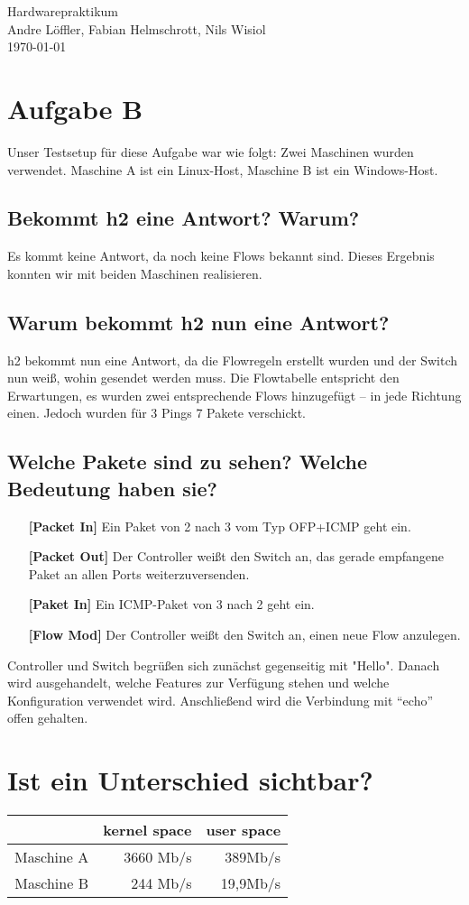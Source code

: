 \documentclass[a4paper,10pt]{scrartcl}
\begin{document}
\begin{center}
  \Huge Hardwarepraktikum \\
  \large Andre Löffler, Fabian Helmschrott, Nils Wisiol \\
  \today
\end{center}


\section*{Aufgabe B}
  Unser Testsetup für diese Aufgabe war wie folgt: Zwei Maschinen wurden verwendet. Maschine A ist ein Linux-Host, Maschine B ist ein Windows-Host.
\subsection*{Bekommt h2 eine Antwort? Warum?}
  Es kommt keine Antwort, da noch keine Flows bekannt sind. Dieses Ergebnis konnten wir mit beiden Maschinen realisieren.
\subsection*{Warum bekommt h2 nun eine Antwort?}
  h2 bekommt nun eine Antwort, da die Flowregeln erstellt wurden und der Switch nun weiß, wohin gesendet werden muss. Die Flowtabelle entspricht den Erwartungen, es wurden zwei entsprechende Flows hinzugefügt -- in jede Richtung einen. Jedoch wurden für 3 Pings 7 Pakete verschickt.
\subsection*{Welche Pakete sind zu sehen? Welche Bedeutung haben sie?}
  \begin{itemize}
    \item[\textbf{[Packet In]}] Ein Paket von 2 nach 3 vom Typ OFP+ICMP geht ein.
    \item[\textbf{[Packet Out]}] Der Controller weißt den Switch an, das gerade empfangene Paket an allen Ports weiterzuversenden.
    \item[\textbf{[Paket In]}] Ein ICMP-Paket von 3 nach 2 geht ein.
    \item[\textbf{[Flow Mod]}] Der Controller weißt den Switch an, einen neue Flow anzulegen.
  \end{itemize}
  Controller und Switch begrüßen sich zunächst gegenseitig mit "Hello". Danach wird ausgehandelt, welche Features zur Verfügung stehen und welche Konfiguration verwendet wird. Anschließend wird die Verbindung mit  ``echo'' offen gehalten.
\section*{Ist ein Unterschied sichtbar?}
  \begin{tabular}{c|rr}
    & kernel space & user space \\ \hline
    Maschine A & 3660 Mb/s & 389Mb/s \\
    Maschine B & 244 Mb/s & 19,9Mb/s \\
  \end{tabular}  
\end{document}
